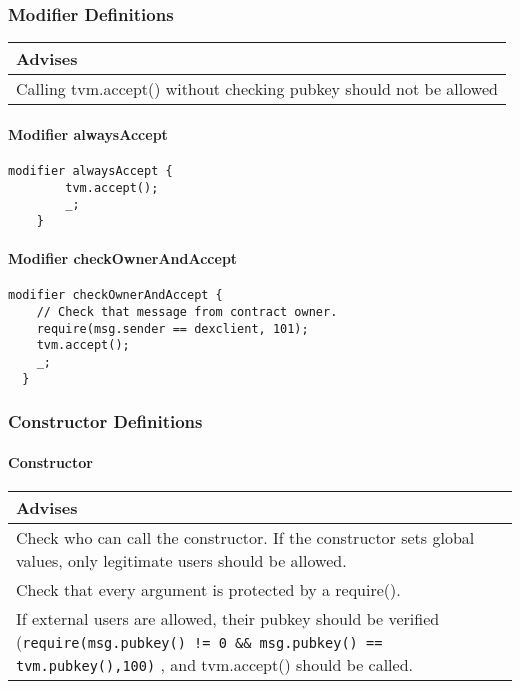 \subsubsection{Modifier Definitions}


\ifsoldraft
\noindent\begin{tabular}{|p{12cm}|}\hline
\rowcolor{green}Advises
\\\hline
Calling tvm.accept() without checking pubkey should not be allowed
\\\hline\end{tabular}
\fi

\paragraph{Modifier alwaysAccept}


\begin{lstlisting}[firstnumber=27]
	modifier alwaysAccept {
		tvm.accept();
		_;
	}
\end{lstlisting}

\paragraph{Modifier checkOwnerAndAccept}


\begin{lstlisting}[firstnumber=32]
  modifier checkOwnerAndAccept {
    // Check that message from contract owner.
    require(msg.sender == dexclient, 101);
    tvm.accept();
    _;
  }
\end{lstlisting}

\subsubsection{Constructor Definitions}


\paragraph{Constructor}

\ifsoldraft
\noindent\begin{tabular}{|p{12cm}|}\hline
\rowcolor{green}Advises
\\\hline
Check who can call the constructor. If the constructor sets global values, only legitimate users should be allowed.
\\\hline
Check that every argument is protected by a require().
\\\hline
If external users are allowed, their pubkey should be verified (\verb+require(msg.pubkey() != 0 && msg.pubkey() == tvm.pubkey(),100)+ , and tvm.accept() should be called.
\\\hline\end{tabular}
\fi

